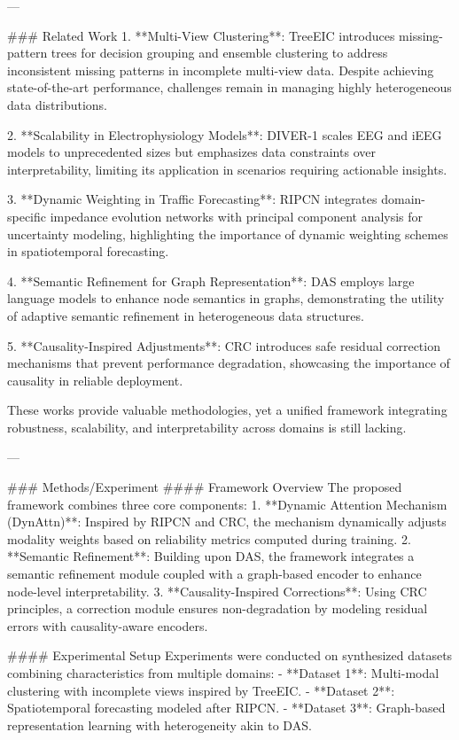 ---

### Related Work  
1. **Multi-View Clustering**: TreeEIC introduces missing-pattern trees for decision grouping and ensemble clustering to address inconsistent missing patterns in incomplete multi-view data. Despite achieving state-of-the-art performance, challenges remain in managing highly heterogeneous data distributions.  

2. **Scalability in Electrophysiology Models**: DIVER-1 scales EEG and iEEG models to unprecedented sizes but emphasizes data constraints over interpretability, limiting its application in scenarios requiring actionable insights.  

3. **Dynamic Weighting in Traffic Forecasting**: RIPCN integrates domain-specific impedance evolution networks with principal component analysis for uncertainty modeling, highlighting the importance of dynamic weighting schemes in spatiotemporal forecasting.  

4. **Semantic Refinement for Graph Representation**: DAS employs large language models to enhance node semantics in graphs, demonstrating the utility of adaptive semantic refinement in heterogeneous data structures.  

5. **Causality-Inspired Adjustments**: CRC introduces safe residual correction mechanisms that prevent performance degradation, showcasing the importance of causality in reliable deployment.  

These works provide valuable methodologies, yet a unified framework integrating robustness, scalability, and interpretability across domains is still lacking.

---

### Methods/Experiment  
#### Framework Overview  
The proposed framework combines three core components:  
1. **Dynamic Attention Mechanism (DynAttn)**: Inspired by RIPCN and CRC, the mechanism dynamically adjusts modality weights based on reliability metrics computed during training.  
2. **Semantic Refinement**: Building upon DAS, the framework integrates a semantic refinement module coupled with a graph-based encoder to enhance node-level interpretability.  
3. **Causality-Inspired Corrections**: Using CRC principles, a correction module ensures non-degradation by modeling residual errors with causality-aware encoders.  

#### Experimental Setup  
Experiments were conducted on synthesized datasets combining characteristics from multiple domains:  
- **Dataset 1**: Multi-modal clustering with incomplete views inspired by TreeEIC.  
- **Dataset 2**: Spatiotemporal forecasting modeled after RIPCN.  
- **Dataset 3**: Graph-based representation learning with heterogeneity akin to DAS.  

